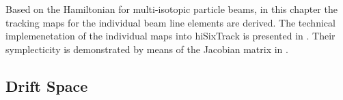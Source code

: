 Based on the Hamiltonian for multi-isotopic particle beams, in this chapter the tracking maps for the individual beam line elements are derived. The technical implemenetation of the individual maps into hiSixTrack is presented in . Their symplecticity is demonstrated by means of the Jacobian matrix in .


\subsection{Drift Space}


